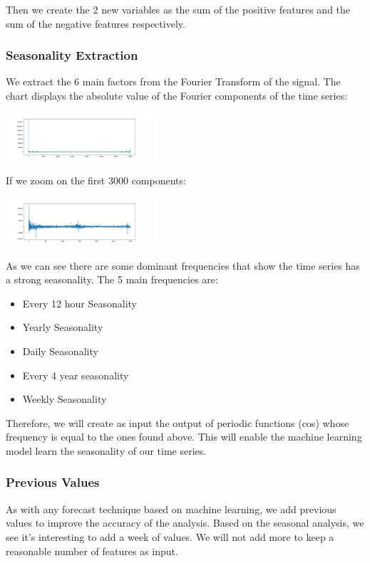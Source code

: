 \documentclass[a4paper,twocolumn,5p]{elsarticle}
\begin{document}
Then we create the 2 new variables as the sum of the positive features and the sum of the negative features respectively.

\subsubsection{Seasonality Extraction}

We extract the 6 main factors from the Fourier Transform of the signal. The chart displays the absolute value of
the Fourier components of the time series:

\includegraphics[width=0.4\textwidth]{decomposition}

If we zoom on the first 3000 components:

\includegraphics[width=0.4\textwidth]{decompositionzoom}

As we can see there are some dominant frequencies that show the time series has a strong seasonality. The 5 main 
frequencies are:

\begin{itemize}
  \item Every 12 hour Seasonality
  \item Yearly Seasonality
  \item Daily Seasonality
  \item Every 4 year seasonality
  \item Weekly Seasonality
\end{itemize} 

Therefore, we will create as input the output of periodic functions (cos) whose frequency is equal to the ones found 
above. This will enable the machine learning model learn the seasonality of our time series.

\subsubsection{Previous Values}

As with any forecast technique based on machine learning, we add previous values to improve the accuracy 
of the analysis. Based on the seasonal analysis, we see it's interesting to add a week of values. We will not 
add more to keep a reasonable number of features as input.
\end{document}
